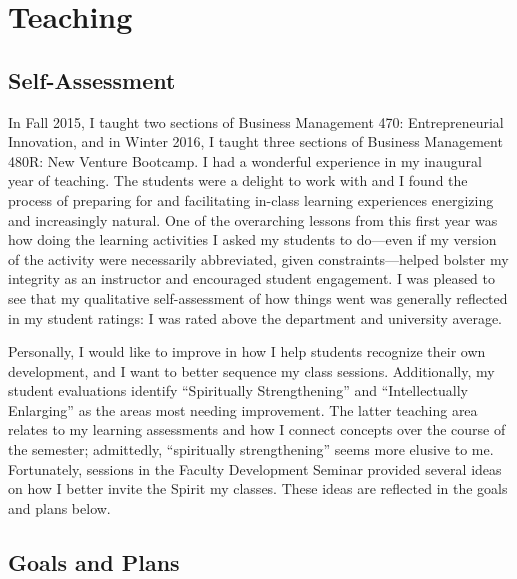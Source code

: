 \documentclass[11pt,article,oneside]{memoir}
\begin{document}
\section{Teaching}\label{teaching}

\subsection{Self-Assessment}\label{self-assessment-1}

In Fall 2015, I taught two sections of Business Management 470:
Entrepreneurial Innovation, and in Winter 2016, I taught three sections
of Business Management 480R: New Venture Bootcamp. I had a wonderful
experience in my inaugural year of teaching. The students were a delight
to work with and I found the process of preparing for and facilitating
in-class learning experiences energizing and increasingly natural. One
of the overarching lessons from this first year was how doing the
learning activities I asked my students to do---even if my version of
the activity were necessarily abbreviated, given constraints---helped
bolster my integrity as an instructor and encouraged student engagement.
I was pleased to see that my qualitative self-assessment of how things
went was generally reflected in my student ratings: I was rated above
the department and university average.

Personally, I would like to improve in how I help students recognize
their own development, and I want to better sequence my class sessions.
Additionally, my student evaluations identify \enquote{Spiritually
Strengthening} and \enquote{Intellectually Enlarging} as the areas most
needing improvement. The latter teaching area relates to my learning
assessments and how I connect concepts over the course of the semester;
admittedly, \enquote{spiritually strengthening} seems more elusive to
me. Fortunately, sessions in the Faculty Development Seminar provided
several ideas on how I better invite the Spirit my classes. These ideas
are reflected in the goals and plans below.

\subsection{Goals and Plans}\label{goals-and-plans-1}
\end{document}
